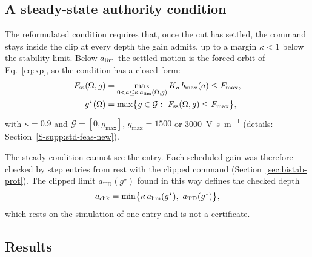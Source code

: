 \subsection{A steady-state authority condition}\label{sec:feas-new}

The reformulated condition requires that, once the cut has settled, the command stays inside the clip at every depth the gain admits, up to a margin $\kappa<1$ below the stability limit. Below $a_{\lim}$ the settled motion is the forced orbit of Eq.~\eqref{eq:xp}, so the condition has a closed form:
\begin{equation}\label{eq:feas}
  \begin{aligned}
    F_{\mathrm{ss}}(\Omega,g)&=\max_{0<a\le\kappa\,\alim(\Omega,g)}K_a\,\bmax(a)\le F_{\max},\\
    g^\star(\Omega)&=\max\bigl\{g\in\mathcal G:\ F_{\mathrm{ss}}(\Omega,g)\le F_{\max}\bigr\},
  \end{aligned}
\end{equation}
with $\kappa=0.9$ and $\mathcal G=[0,g_{\max}]$, $g_{\max}=1500$ or \SI{3000}{\volt\second\per\metre} (details: Section~\ref{S-supp:std-feas-new}).

The steady condition cannot see the entry. Each scheduled gain was therefore checked by step entries from rest with the clipped command (Section~\ref{sec:bistab-prot}). The clipped limit $a_{\mathrm{TD}}(g^\star)$ found in this way defines the checked depth
\begin{equation}\label{eq:achk}
  \achk=\min\bigl\{\kappa\,\alim(g^\star),\ a_{\mathrm{TD}}(g^\star)\bigr\},
\end{equation}
which rests on the simulation of one entry and is not a certificate.

\subsection{Results}\label{sec:feas-res}

